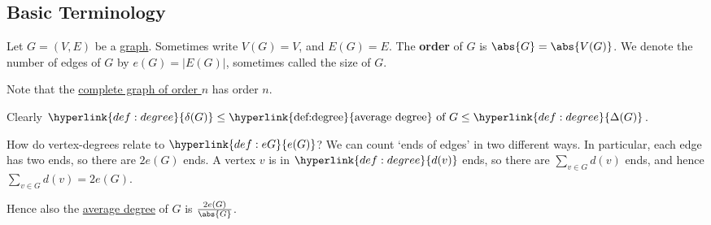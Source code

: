 \documentclass{article}
\begin{document}
\subsection{Basic Terminology}

Let $G = (V, E)$ be a \hyperlink{def:graph}{graph}. Sometimes write $V(G) = V$, and $E(G) = E$.
The \textbf{order} of $G$ is \hypertarget{def:order}{$\abs{G} = \abs{V(G)}$}. We denote the number of edges of $G$ by \hypertarget{def:eG}{$e(G) = |E(G)|$}, sometimes called the size of $G$.

Note that the \hyperlink{def:Kn}{complete graph of order $n$} has order $n$.



Clearly $\hyperlink{def:degree}{\delta(G)} \leq \text{\hyperlink{def:degree}{average degree} of } G \leq \hyperlink{def:degree}{\Delta(G)}$.


\begin{eg}
    How do vertex-degrees relate to $\hyperlink{def:eG}{e(G)}$?  We can count `ends of edges' in two different ways.
    In particular, each edge has two ends, so there are $2 e(G)$ ends.
    A vertex $v$ is in $\hyperlink{def:degree}{d(v)}$ ends, so there are $\sum_{v \in G} d(v)$ ends, and hence  $\sum_{v \in G} d(v)= 2 e(G)$.

    Hence also the \hyperlink{def:degree}{average degree} of $G$ is $\frac{2e(G)}{\abs{G}}$.
\end{eg}
\end{document}
